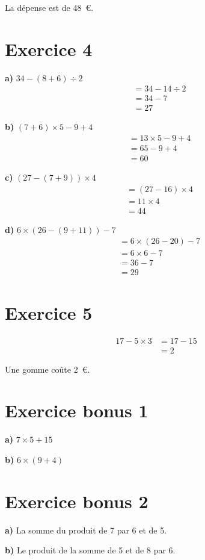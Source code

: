 \documentclass[12pt]{extarticle}
\begin{document}
La dépense est de 48~€.

\section*{Exercice 4}

\textbf{a)} $34 - (8 + 6) \div 2$
\begin{align*}
&= 34 - 14 \div 2 \\
&= 34 - 7 \\
&= 27
\end{align*}

\textbf{b)} $(7 + 6) \times 5 - 9 + 4$
\begin{align*}
&= 13 \times 5 - 9 + 4 \\
&= 65 - 9 + 4 \\
&= 60
\end{align*}

\textbf{c)} $(27 - (7 + 9)) \times 4$
\begin{align*}
&= (27 - 16) \times 4 \\
&= 11 \times 4 \\
&= 44
\end{align*}

\textbf{d)} $6 \times (26 - (9 + 11)) - 7$
\begin{align*}
&= 6 \times (26 - 20) - 7 \\
&= 6 \times 6 - 7 \\
&= 36 - 7 \\
&= 29
\end{align*}

\section*{Exercice 5}
\begin{align*}
17 - 5 \times 3 &= 17 - 15 \\
                &= 2
\end{align*}

Une gomme coûte 2~€.

\section*{Exercice bonus 1}

\textbf{a)} $7 \times 5 + 15$

\textbf{b)} $6 \times (9 + 4)$

\section*{Exercice bonus 2}

\textbf{a)} La somme du produit de 7 par 6 et de 5.

\textbf{b)} Le produit de la somme de 5 et de 8 par 6.
\end{document}
